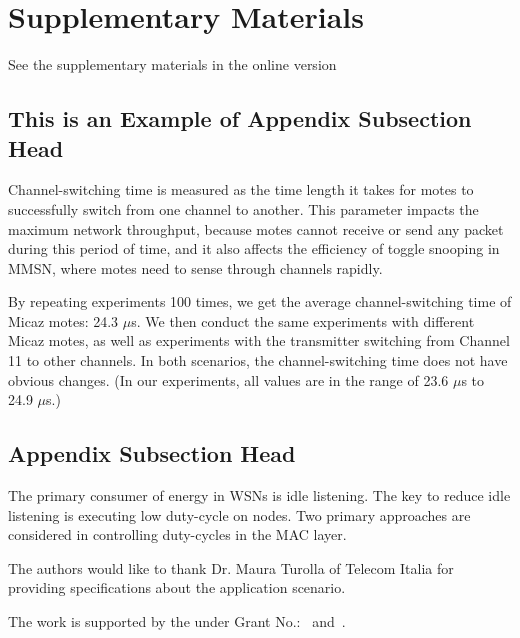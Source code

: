 \section{Supplementary Materials}


\begin{printonly}
  See the supplementary materials in the online version
\end{printonly}

\begin{screenonly}
\subsection{This is an Example of Appendix Subsection Head}

Channel-switching time is measured as the time length it takes for
motes to successfully switch from one channel to another. This
parameter impacts the maximum network throughput, because motes
cannot receive or send any packet during this period of time, and it
also affects the efficiency of toggle snooping in MMSN, where motes
need to sense through channels rapidly.

By repeating experiments 100 times, we get the average
channel-switching time of Micaz motes: 24.3 $\mu$s. We then conduct
the same experiments with different Micaz motes, as well as
experiments with the transmitter switching from Channel 11 to other
channels. In both scenarios, the channel-switching time does not have
obvious changes. (In our experiments, all values are in the range of
23.6 $\mu$s to 24.9 $\mu$s.)

\subsection{Appendix Subsection Head}

The primary consumer of energy in WSNs is idle listening. The key to
reduce idle listening is executing low duty-cycle on nodes. Two
primary approaches are considered in controlling duty-cycles in the
MAC layer.

\end{screenonly}

\begin{acks}

The authors would like to thank Dr. Maura Turolla of Telecom
Italia for providing specifications about the application scenario.

The work is supported by the  under Grant
No.:~
and~.


\end{acks}



